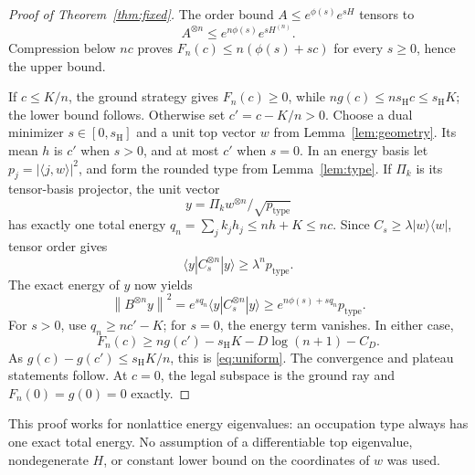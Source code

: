 \documentclass[11pt,a4paper]{article}
\theoremstyle{remark}
\newcommand{\ket}[1]{|#1\rangle}
\newcommand{\bra}[1]{\langle #1|}
\newcommand{\norm}[1]{\left\|#1\right\|}
\newcommand{\sh}{s_{\mathrm H}}
\begin{document}
\begin{proof}[Proof of Theorem~\ref{thm:fixed}]
The order bound \(A\leq e^{\phi(s)}e^{sH}\) tensors to
\[
 A^{\otimes n}\leq e^{n\phi(s)}e^{sH^{(n)}}.
\]
Compression below \(nc\) proves \(F_n(c)\leq n(\phi(s)+sc)\) for every
\(s\geq0\), hence the upper bound.

If \(c\leq K/n\), the ground strategy gives \(F_n(c)\geq0\), while
\(ng(c)\leq n\sh c\leq\sh K\); the lower bound follows.
Otherwise set \(c'=c-K/n>0\). Choose a dual minimizer \(s\in[0,\sh]\)
and a unit top vector \(w\) from Lemma~\ref{lem:geometry}. Its mean \(h\)
is \(c'\) when \(s>0\), and at most \(c'\) when \(s=0\).
In an energy basis let \(p_j=|\langle j,w\rangle|^2\), and form the rounded
type from Lemma~\ref{lem:type}. If \(\Pi_k\) is its tensor-basis projector,
the unit vector
\[
 y=\Pi_k w^{\otimes n}/\sqrt{p_{\mathrm{type}}}
\]
has exactly one total energy \(q_n=\sum_jk_jh_j\leq nh+K\leq nc\).
Since \(C_s\geq\lambda\ket w\bra w\), tensor order gives
\[
 \bra yC_s^{\otimes n}\ket y\geq\lambda^np_{\mathrm{type}}.
\]
The exact energy of \(y\) now yields
\begin{equation}\label{eq:typelower}
 \norm{B^{\otimes n}y}^2
 =e^{sq_n}\bra yC_s^{\otimes n}\ket y
 \geq e^{n\phi(s)+sq_n}p_{\mathrm{type}}.
\end{equation}
For \(s>0\), use \(q_n\geq nc'-K\); for \(s=0\), the energy term vanishes.
In either case,
\[
 F_n(c)\geq ng(c')-\sh K-D\log(n+1)-C_D.
\]
As \(g(c)-g(c')\leq\sh K/n\), this is \eqref{eq:uniform}.
The convergence and plateau statements follow. At \(c=0\), the legal
subspace is the ground ray and \(F_n(0)=g(0)=0\) exactly.
\end{proof}

This proof works for nonlattice energy eigenvalues: an occupation type
always has one exact total energy. No assumption of a differentiable
top eigenvalue, nondegenerate \(H\), or constant lower bound on the
coordinates of \(w\) was used.
\end{document}
